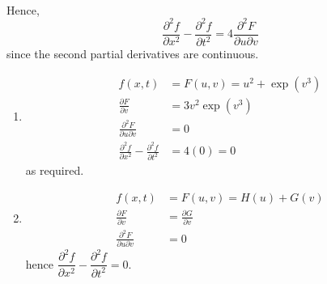 \begin{solution}
\begin{align*}
    \end{align*}
    Hence, \[ \dfrac{\partial^2 f}{\partial x^2} - \dfrac{\partial^2 f}{\partial t^2} = 4 \dfrac{\partial^2 F}{\partial u \partial v} \] since the second partial derivatives are continuous. 
    \begin{enumerate}
        \item
            \begin{align*}
                f(x, t) &= F(u, v) = u^2 + \exp{(v^3)} \\
                \frac{\partial F}{\partial v} &= 3v^2 \exp{(v^3)} \\
                \frac{\partial^2 F}{\partial u \partial v} &= 0 \\
                \frac{\partial^2 f}{\partial x^2} - \frac{\partial^2 f}{\partial t^2} &= 4\left( 0 \right) = 0 
            \end{align*}
            as required.

        \item
            \begin{align*}
                f(x, t) &= F(u, v) = H(u) + G(v) \\ 
                \frac{\partial F}{\partial v} &= \frac{\partial G}{\partial v} \\
                \frac{\partial^2 F}{\partial u \partial v} &= 0
            \end{align*}
            hence $\dfrac{\partial^2 f}{\partial x^2} - \dfrac{\partial^2 f}{\partial t^2} = 0$.
    \end{enumerate}
\end{solution}
